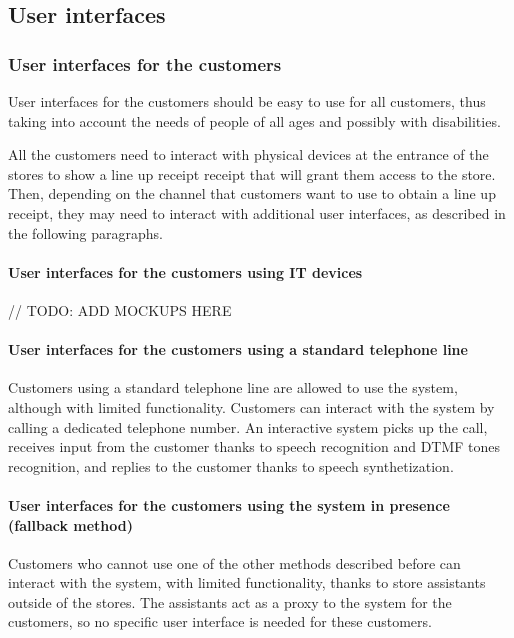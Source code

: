 \documentclass[../../main.tex]{subfiles}
\begin{document}
\subsection{User interfaces}

  \subsubsection{User interfaces for the customers}

  User interfaces for the customers should be easy to use for all customers, thus taking into account the needs of people of all ages and possibly with disabilities.

  All the customers need to interact with physical devices at the entrance of the stores to show a line up receipt receipt that will grant them access to the store. Then, depending on the channel that customers want to use to obtain a line up receipt, they may need to interact with additional user interfaces, as described in the following paragraphs.

  \paragraph{User interfaces for the customers using IT devices}

  // TODO: ADD MOCKUPS HERE

  \paragraph{User interfaces for the customers using a standard telephone line}

  Customers using a standard telephone line are allowed to use the system, although with limited functionality. Customers can interact with the system by calling a dedicated telephone number. An interactive system picks up the call, receives input from the customer thanks to speech recognition and DTMF tones recognition, and replies to the customer thanks to speech synthetization.

  \paragraph{User interfaces for the customers using the system in presence (fallback method)}

  Customers who cannot use one of the other methods described before can interact with the system, with limited functionality, thanks to store assistants outside of the stores. The assistants act as a proxy to the system for the customers, so no specific user interface is needed for these customers.
\end{document}
